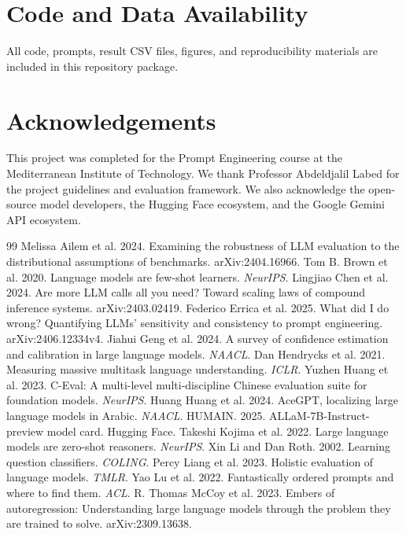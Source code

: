 \documentclass[10pt,twocolumn]{article}
\begin{document}
\section*{Code and Data Availability}
All code, prompts, result CSV files, figures, and reproducibility materials are included in this repository package.
\section*{Acknowledgements}
This project was completed for the Prompt Engineering course at the Mediterranean Institute of Technology. We thank Professor Abdeldjalil Labed for the project guidelines and evaluation framework. We also acknowledge the open-source model developers, the Hugging Face ecosystem, and the Google Gemini API ecosystem.
\begin{thebibliography}{99}
 Melissa Ailem et al. 2024. Examining the robustness of LLM evaluation to the distributional assumptions of benchmarks. arXiv:2404.16966.
 Tom B. Brown et al. 2020. Language models are few-shot learners. \textit{NeurIPS}.
 Lingjiao Chen et al. 2024. Are more LLM calls all you need? Toward scaling laws of compound inference systems. arXiv:2403.02419.
 Federico Errica et al. 2025. What did I do wrong? Quantifying LLMs' sensitivity and consistency to prompt engineering. arXiv:2406.12334v4.
 Jiahui Geng et al. 2024. A survey of confidence estimation and calibration in large language models. \textit{NAACL}.
 Dan Hendrycks et al. 2021. Measuring massive multitask language understanding. \textit{ICLR}.
 Yuzhen Huang et al. 2023. C-Eval: A multi-level multi-discipline Chinese evaluation suite for foundation models. \textit{NeurIPS}.
 Huang Huang et al. 2024. AceGPT, localizing large language models in Arabic. \textit{NAACL}.
 HUMAIN. 2025. ALLaM-7B-Instruct-preview model card. Hugging Face.
 Takeshi Kojima et al. 2022. Large language models are zero-shot reasoners. \textit{NeurIPS}.
 Xin Li and Dan Roth. 2002. Learning question classifiers. \textit{COLING}.
 Percy Liang et al. 2023. Holistic evaluation of language models. \textit{TMLR}.
 Yao Lu et al. 2022. Fantastically ordered prompts and where to find them. \textit{ACL}.
 R. Thomas McCoy et al. 2023. Embers of autoregression: Understanding large language models through the problem they are trained to solve. arXiv:2309.13638.

\end{thebibliography}
\end{document}
